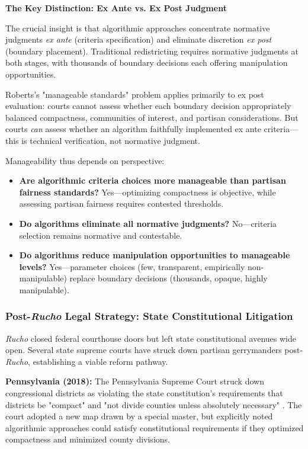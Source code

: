 \textbf{The Key Distinction: Ex Ante vs. Ex Post Judgment}

The crucial insight is that algorithmic approaches concentrate normative judgments \textit{ex ante} (criteria specification) and eliminate discretion \textit{ex post} (boundary placement). Traditional redistricting requires normative judgments at both stages, with thousands of boundary decisions each offering manipulation opportunities.

Roberts's "manageable standards" problem applies primarily to ex post evaluation: courts cannot assess whether each boundary decision appropriately balanced compactness, communities of interest, and partisan considerations. But courts \textit{can} assess whether an algorithm faithfully implemented ex ante criteria—this is technical verification, not normative judgment.

Manageability thus depends on perspective:
\begin{itemize}
\item \textbf{Are algorithmic criteria choices more manageable than partisan fairness standards?} Yes—optimizing compactness is objective, while assessing partisan fairness requires contested thresholds.
\item \textbf{Do algorithms eliminate all normative judgments?} No—criteria selection remains normative and contestable.
\item \textbf{Do algorithms reduce manipulation opportunities to manageable levels?} Yes—parameter choices (few, transparent, empirically non-manipulable) replace boundary decisions (thousands, opaque, highly manipulable).
\end{itemize}

\subsubsection{Post-\textit{Rucho} Legal Strategy: State Constitutional Litigation}

\textit{Rucho} closed federal courthouse doors but left state constitutional avenues wide open. Several state supreme courts have struck down partisan gerrymanders post-\textit{Rucho}, establishing a viable reform pathway.

\textbf{Pennsylvania (2018):} The Pennsylvania Supreme Court struck down congressional districts as violating the state constitution's requirements that districts be "compact" and "not divide counties unless absolutely necessary" \citep{pennsylvania2018}. The court adopted a new map drawn by a special master, but explicitly noted algorithmic approaches could satisfy constitutional requirements if they optimized compactness and minimized county divisions.

